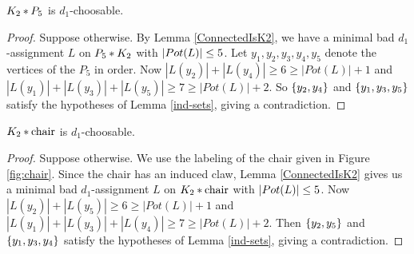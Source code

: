 

\begin{lem}
$K_2 \mbox{\hspace{2 pt}$\ast$\hspace{2 pt}} P_5$ is $d_1$-choosable.
\label{P_5*K_2}
\end{lem}
\begin{proof}
Suppose otherwise. By Lemma \ref{ConnectedIsK2}, we have a minimal bad
$d_1$-assignment $L$ on $P_5 \mbox{\hspace{2 pt}$\ast$\hspace{2 pt}} K_2$ with $\left|Pot(L)\right| \leq 5$.  Let
$y_1, y_2, y_3, y_4, y_5$ denote the vertices of the $P_5$ in order.  Now
$|L(y_2)|+|L(y_4)|\ge 6 \ge |Pot(L)|+1$ and $|L(y_1)|+|L(y_3)|+|L(y_5)|\ge 7
\ge |Pot(L)|+2$.  So $\left\{ y_2, y_4 \right\}$ and $\left\{ y_1, y_3, y_5 \right\}$ satisfy the
hypotheses of Lemma \ref{ind-sets}, giving a contradiction.
\end{proof}



\begin{lem}
$K_2 \mbox{\hspace{2 pt}$\ast$\hspace{2 pt}} \text{chair}$ is $d_1$-choosable.
\label{chair*K_2}
\end{lem}
\begin{proof}
Suppose otherwise. We use the labeling of the chair given in Figure
\ref{fig:chair}.  Since the chair has an induced claw, Lemma \ref{ConnectedIsK2}
gives us a minimal bad $d_1$-assignment $L$ on $K_2 \mbox{\hspace{2 pt}$\ast$\hspace{2 pt}} \text{chair}$ with
$\left|Pot(L)\right| \leq 5$.  Now $|L(y_2)|+|L(y_5)|\ge 6 \ge |Pot(L)|+1$ and
$|L(y_1)|+|L(y_3)|+|L(y_4)|\ge 7 \ge |Pot(L)|+2$.  Then $\left\{ y_2, y_5 \right\}$ and
$\left\{ y_1, y_3, y_4 \right\}$ satisfy the hypotheses of Lemma \ref{ind-sets}, giving a
contradiction.
\end{proof}

